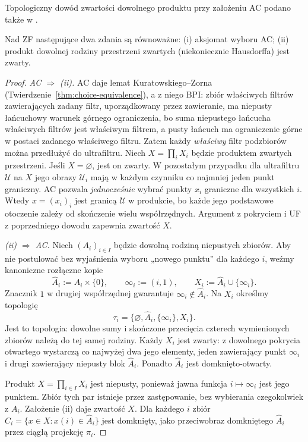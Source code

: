 Topologiczny dowód zwartości dowolnego produktu przy założeniu AC podano także w .

\begin{twierdzenie}
\label{thm:ac-full-tychonoff}
Nad ZF następujące dwa zdania są równoważne:
(i) aksjomat wyboru AC;
(ii) produkt dowolnej rodziny przestrzeni zwartych
(niekoniecznie Hausdorffa) jest zwarty.
\end{twierdzenie}
\begin{proof}
\emph{AC $\Rightarrow$ (ii).}
AC daje lemat Kuratowskiego--Zorna
(Twierdzenie~\ref{thm:choice-equivalence}), a z niego
BPI: zbiór właściwych filtrów zawierających zadany filtr,
uporządkowany przez zawieranie, ma niepusty łańcuchowy
warunek górnego ograniczenia, bo suma niepustego łańcucha
właściwych filtrów jest właściwym filtrem, a pusty
łańcuch ma ograniczenie górne w postaci
zadanego właściwego filtru.
Zatem każdy \emph{właściwy}
filtr podzbiorów można przedłużyć do ultrafiltru.
Niech $X=\prod_i X_i$ będzie produktem zwartych
przestrzeni. Jeśli $X=\varnothing$,
jest on zwarty.
W pozostałym przypadku dla ultrafiltru
$\mathcal U$ na $X$ jego
obrazy $\mathcal U_i$ mają w każdym czynniku co najmniej
jeden punkt graniczny. AC pozwala \emph{jednocześnie}
wybrać punkty $x_i$ graniczne dla wszystkich $i$.
Wtedy $x=(x_i)_i$ jest granicą $\mathcal U$ w produkcie,
bo każde jego podstawowe otoczenie zależy od skończenie
wielu współrzędnych. Argument z pokryciem i UF z
poprzedniego dowodu zapewnia zwartość $X$.

\emph{(ii) $\Rightarrow$ AC.}
Niech $(A_i)_{i\in I}$ będzie dowolną rodziną
niepustych zbiorów. Aby nie postulować bez wyjaśnienia
wyboru „nowego punktu” dla każdego $i$,
weźmy kanoniczne rozłączne kopie
\[
\widehat A_i:=A_i\times\{0\},\qquad
\infty_i:=(i,1),\qquad
X_i:=\widehat A_i\cup\{\infty_i\}.
\]
Znacznik $1$ w drugiej współrzędnej
gwarantuje $\infty_i\notin\widehat A_i$.
Na $X_i$ określmy topologię
\[
\tau_i=\{\varnothing,\widehat A_i,
                 \{\infty_i\},X_i\}.
\]
Jest to topologia: dowolne sumy i skończone
przecięcia czterech wymienionych zbiorów
należą do tej samej rodziny.
Każdy $X_i$ jest zwarty:
z dowolnego pokrycia otwartego wystarczą
co najwyżej dwa jego elementy,
jeden zawierający punkt $\infty_i$
i drugi zawierający niepusty blok $\widehat A_i$.
Ponadto $\widehat A_i$ jest domknięto-otwarty.

Produkt $X=\prod_{i\in I}X_i$
jest niepusty, ponieważ jawna funkcja
$i\mapsto\infty_i$ jest jego punktem.
Zbiór tych par istnieje przez zastępowanie,
bez wybierania czegokolwiek z $A_i$.
Założenie (ii) daje zwartość $X$.
Dla każdego $i$ zbiór
$C_i=\{x\in X:x(i)\in\widehat A_i\}$
jest domknięty, jako przeciwobraz
domkniętego $\widehat A_i$ przez ciągłą
projekcję $\pi_i$.


\end{proof}
